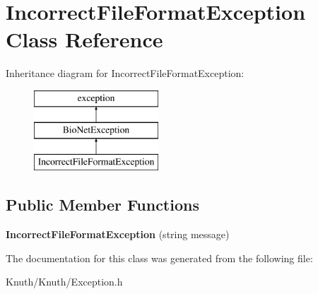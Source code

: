 \hypertarget{class_incorrect_file_format_exception}{}\section{Incorrect\+File\+Format\+Exception Class Reference}
\label{class_incorrect_file_format_exception}
Inheritance diagram for Incorrect\+File\+Format\+Exception\+:\begin{figure}[H]
\begin{center}
\leavevmode
\includegraphics[height=3.000000cm]{class_incorrect_file_format_exception}
\end{center}
\end{figure}
\subsection*{Public Member Functions}
\begin{DoxyCompactItemize}
\item 
\mbox{\label{class_incorrect_file_format_exception_aa7a1beea854053882117309870d7e9ca}} 
{\bfseries Incorrect\+File\+Format\+Exception} (string message)
\end{DoxyCompactItemize}


The documentation for this class was generated from the following file\+:\begin{DoxyCompactItemize}
\item 
Knuth/\+Knuth/Exception.\+h\end{DoxyCompactItemize}
